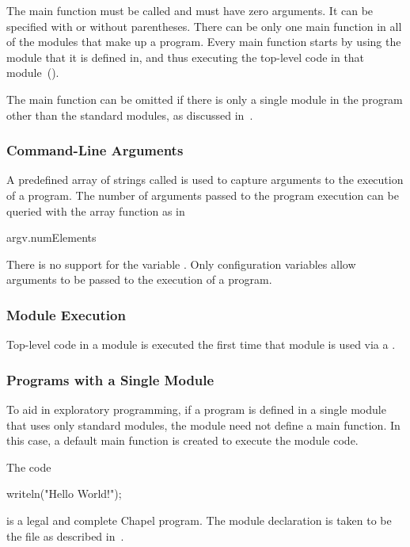 The main function must be called  and must have zero
arguments.  It can be specified with or without parentheses.  There
can be only one main function in all of the modules that make up a
program.  Every main function starts by using the module that it is
defined in, and thus executing the top-level code in that
module~().

The main function can be omitted if there is only a single module in
the program other than the standard modules, as discussed
in~.

\subsubsection{Command-Line Arguments}
\label{Command_Line_Arguments}

A predefined array of strings called  is used to capture
arguments to the execution of a program.
The number of arguments passed to the program execution can be queried
with the array  function as in
\begin{chapel}
argv.numElements
\end{chapel}

\begin{status}
There is no support for the variable .  Only configuration
variables allow arguments to be passed to the execution of a program.
\end{status}

\subsubsection{Module Execution}
\label{Module_Execution}

Top-level code in a module is executed the first time that module is
used via a .

\subsubsection{Programs with a Single Module}
\label{Programs_with_a_Single_Module}


To aid in exploratory programming, if a program is defined in a single
module that uses only standard modules, the module need not define a
main function.  In this case, a default main function is created to
execute the module code.
\begin{example}
The code
\begin{chapel}
writeln("Hello World!");
\end{chapel}
is a legal and complete Chapel program.  The module declaration is
taken to be the file as described in~.
\end{example}

